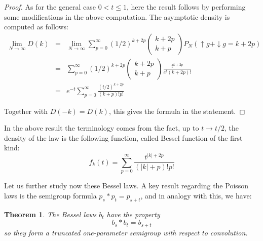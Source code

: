 \documentclass[12pt]{amsbook}
\newtheorem{theorem}{Theorem}[chapter]
\begin{document}
\begin{proof}
As for the general case $0<t\leq 1$, here the result follows by performing some modifications in the above computation. The asymptotic density is computed as follows:
\begin{eqnarray*}
\lim_{N\to\infty}D(k)
&=&\lim_{N\to\infty}\sum_{p=0}^\infty(1/2)^{k+2p}\begin{pmatrix}k+2p\\ k+p\end{pmatrix} P_N(\uparrow g+\downarrow g=k+2p)\\
&=&\sum_{p=0}^\infty(1/2)^{k+2p}\begin{pmatrix}k+2p\\
k+p\end{pmatrix}\frac{t^{k+2p}}{e^t(k+2p)!}\\
&=&e^{-t}\sum_{p=0}^\infty \frac{(t/2)^{k+2p}}{(k+p)!p!}
\end{eqnarray*}

Together with $D(-k)=D(k)$, this gives the formula in the statement.
\end{proof}

In the above result the terminology comes from the fact, up to $t\to t/2$, the density of the law is the following function, called Bessel function of the first kind:
$$f_k(t)=\sum_{p=0}^\infty \frac{t^{|k|+2p}}{(|k|+p)!p!}$$

Let us further study now these Bessel laws. A key result regarding the Poisson laws is the semigroup formula $p_s*p_t=p_{s+t}$, and in analogy with this, we have:


\begin{theorem}
The Bessel laws $b_t$ have the property
$$b_s*b_t=b_{s+t}$$
so they form a truncated one-parameter semigroup
with respect to convolution.
\end{theorem}
\end{document}
